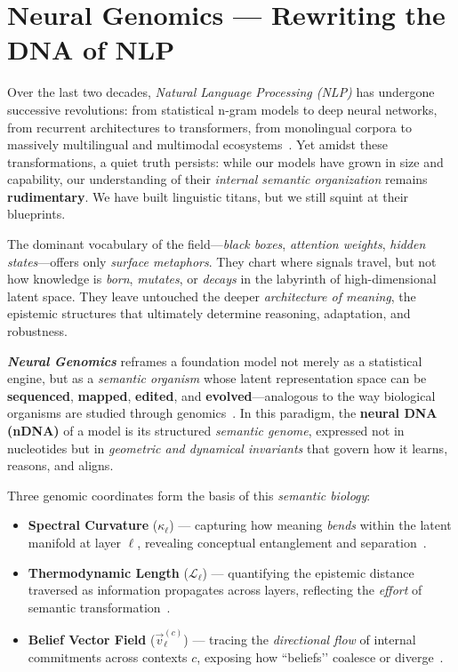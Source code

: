 \section{\textbf{Neural Genomics — Rewriting the DNA of NLP}}

Over the last two decades, \emph{Natural Language Processing (NLP)} has undergone successive revolutions: from statistical n-gram models to deep neural networks, from recurrent architectures to transformers, from monolingual corpora to massively multilingual and multimodal ecosystems~\cite{vaswani2017attention, devlin2019bert, raffel2020t5, brown2020language}. Yet amidst these transformations, a quiet truth persists: while our models have grown in size and capability, our understanding of their \emph{internal semantic organization} remains \textbf{rudimentary}. We have built linguistic titans, but we still squint at their blueprints.

The dominant vocabulary of the field—\emph{black boxes}, \emph{attention weights}, \emph{hidden states}—offers only \emph{surface metaphors}. They chart where signals travel, but not how knowledge is \emph{born}, \emph{mutates}, or \emph{decays} in the labyrinth of high-dimensional latent space. They leave untouched the deeper \emph{architecture of meaning}, the epistemic structures that ultimately determine reasoning, adaptation, and robustness.

\textbf{\emph{Neural Genomics}} reframes a foundation model not merely as a statistical engine, but as a \emph{semantic organism} whose latent representation space can be \textbf{sequenced}, \textbf{mapped}, \textbf{edited}, and \textbf{evolved}—analogous to the way biological organisms are studied through genomics~\cite{pierce2017genetics, alon2019introduction}. In this paradigm, the \textbf{neural DNA (nDNA)} of a model is its structured \emph{semantic genome}, expressed not in nucleotides but in \emph{geometric and dynamical invariants} that govern how it learns, reasons, and aligns.

Three genomic coordinates form the basis of this \emph{semantic biology}:
\begin{itemize}
    \item \textbf{Spectral Curvature} ($\kappa_\ell$) — capturing how meaning \emph{bends} within the latent manifold at layer $\ell$, revealing conceptual entanglement and separation~\cite{bronstein2017geometric, shuman2013emerging}.
    \item \textbf{Thermodynamic Length} ($\mathcal{L}_\ell$) — quantifying the epistemic distance traversed as information propagates across layers, reflecting the \emph{effort} of semantic transformation~\cite{crooks2007measuring, sivak2012thermodynamic}.
    \item \textbf{Belief Vector Field} ($\vec{v}^{(c)}_\ell$) — tracing the \emph{directional flow} of internal commitments across contexts $c$, exposing how ``beliefs’’ coalesce or diverge~\cite{das2024tracealign, liu2023belief}.
\end{itemize}

